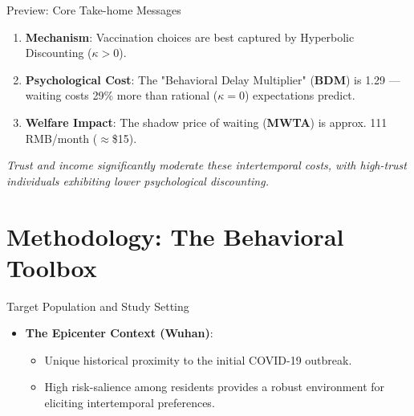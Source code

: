 \documentclass[10pt]{beamer}
\begin{document}
\begin{frame}{Preview: Core Take-home Messages}
  \begin{enumerate}
    \item \textbf{Mechanism}: Vaccination choices are best captured by \alert{Hyperbolic Discounting} ($\kappa > 0$).
    \item \textbf{Psychological Cost}: The "Behavioral Delay Multiplier" (\textbf{BDM}) is \alert{1.29} --- waiting costs 29\% more than rational ($\kappa=0$) expectations predict.
    \item \textbf{Welfare Impact}: The shadow price of waiting (\textbf{MWTA}) is approx. \alert{111 RMB/month} ($\approx$\$15).
  \end{enumerate}
  \vfill
  \begin{center}
    \textit{Trust and income significantly moderate these intertemporal costs, with high-trust individuals exhibiting lower psychological discounting.}
  \end{center}
\end{frame}
\section{Methodology: The Behavioral Toolbox}

\begin{frame}{Target Population and Study Setting}
\begin{itemize}
\item \textbf{The Epicenter Context (Wuhan)}:
\begin{itemize}
\item Unique historical proximity to the initial COVID-19 outbreak.
\item High \alert{risk-salience} among residents provides a robust environment for eliciting intertemporal preferences.
\end{itemize}
\end{itemize}
\end{frame}
\end{document}
